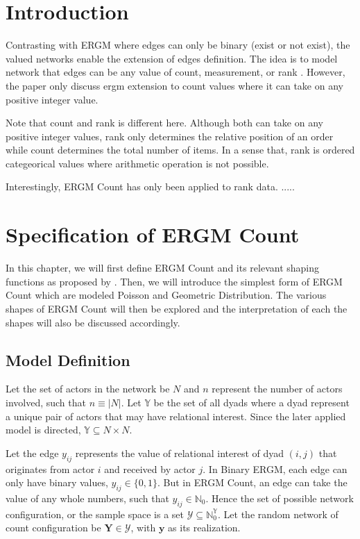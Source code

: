 \documentclass[12pt,a4paper,twoside,openany]{book}\usepackage[]{graphicx}\usepackage[]{color}
\begin{document}
\chapter{Introduction}
Contrasting with ERGM where edges can only be binary (exist or not exist), the valued networks enable the extension of edges definition. The idea is to model network that edges can be any value of count, measurement, or rank \citep{countergmdefined}. However, the paper only discuss ergm extension to count values where it can take on any positive integer value. 

Note that count and rank is different here. Although both can take on any positive integer values, rank only determines the relative position of an order while count determines the total number of items. In a sense that, rank is ordered categeorical values where arithmetic operation is not possible.

Interestingly, ERGM Count has only been applied to rank data. .....


\chapter{Specification of ERGM Count}%
In this chapter, we will first define ERGM Count and its relevant shaping functions as proposed by \citet{countergmdefined}. 
Then, we will introduce the simplest form of ERGM Count which are modeled Poisson and Geometric Distribution. 
The various shapes of ERGM Count will then be explored and the interpretation of each the shapes will also be discussed accordingly. 

\section{Model Definition}
Let the set of actors in the network be $N$ and $n$ represent the number of actors involved, such that $n \equiv |N|$.
Let $\mathbb{Y}$ be the set of all dyads where a dyad represent a unique pair of actors that may have relational interest. 
Since the later applied model is directed, $\mathbb{Y} \subseteq N \times N$. 

Let the edge $y_{ij}$ represents the value of relational interest of dyad $(i,j)$ that originates from actor $i$ and received by actor $j$.
In Binary ERGM, each edge can only have binary values, $y_{ij} \in \{0,1\}$. 
But in ERGM Count, an edge can take the value of any whole numbers, such that $y_{ij} \in \mathbb{N}_0$. 
Hence the set of possible network configuration, or the sample space is a set $\mathcal{Y} \subseteq \mathbb{N}_{0}^{\mathbb{Y}}$. 
Let the random network of count configuration be $\bm{Y} \in \mathcal{Y}$, with $\bm{y}$ as its realization.
\end{document}
